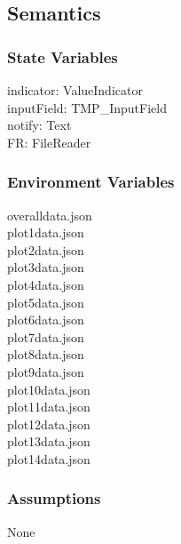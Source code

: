 \documentclass[12pt, titlepage]{article}
\begin{document}
\subsection{Semantics}

\subsubsection{State Variables}
 indicator: ValueIndicator\\
 inputField: TMP\_InputField\\
notify: Text \\
FR: FileReader 
\subsubsection{Environment Variables}
overalldata.json\\
plot1data.json\\
plot2data.json\\
plot3data.json\\
plot4data.json\\
plot5data.json\\
plot6data.json\\
plot7data.json\\
plot8data.json\\
plot9data.json\\
plot10data.json\\
plot11data.json\\
plot12data.json\\
plot13data.json\\
plot14data.json

\subsubsection{Assumptions}
None
\end{document}
